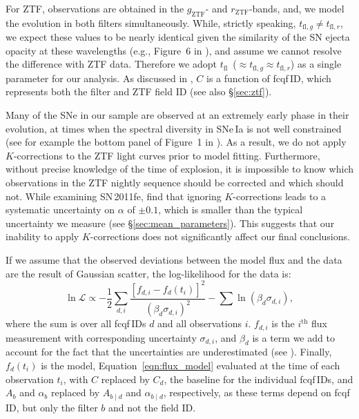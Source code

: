 \documentclass[twocolumn]{./aastex63}
\newcommand{\rztf}{$r_\mathrm{ZTF}$}
\newcommand{\gztf}{$g_\mathrm{ZTF}$}
\newcommand{\tfl}{$t_\mathrm{fl}$}
\begin{document}
For ZTF, observations are obtained in the \gztf- and \rztf-bands, and, we
model the evolution in both filters simultaneously. While, strictly speaking,
$t_{\mathrm{fl}, g} \ne t_{\mathrm{fl}, r}$, we expect these values to be
nearly identical given the similarity of the SN ejecta opacity at these
wavelengths (e.g., Figure~6 in \citealt{Magee18}), and assume we cannot
resolve the difference with ZTF data. Therefore we adopt \tfl\ ($\approx
t_{\mathrm{fl}, g} \approx t_{\mathrm{fl}, r}$) as a single parameter for our
analysis. As discussed in \citet{Yao19}, $C$ is a function of fcqf\,ID, which
represents both the filter and ZTF field ID (see also \S\ref{sec:ztf}).

Many of the SNe in our sample are observed at an extremely early phase in
their evolution, at times when the spectral diversity in SNe\,Ia is not well
constrained (see for example the bottom panel of Figure~1 in \citealt{Guy07}).
As a result, we do not apply $K$-corrections to the ZTF light curves prior to
model fitting. Furthermore, without precise knowledge of the time of
explosion, it is impossible to know which observations in the ZTF nightly
sequence should be corrected and which should not. While examining SN\,2011fe,
\citet{Firth15} find that ignoring $K$-corrections leads to a systematic
uncertainty on $\alpha$ of $\pm0.1$, which is smaller than the typical
uncertainty we measure (see \S\ref{sec:mean_parameters}). This suggests that
our inability to apply $K$-corrections does not significantly affect our final
conclusions.

If we assume that the observed deviations between the model flux and the data
are the result of Gaussian scatter, the log-likelihood for the data is:
%
\begin{equation}
    \ln \mathscr{L} \propto -\frac{1}{2}\sum_{d,i} \frac{[f_{d,i} - f_d(t_i)]^2}{(\beta_d \sigma_{d,i})^2} -\sum{\ln (\beta_d \sigma_{d,i})},
\end{equation}
%
where the sum is over all fcqf\,IDs $d$ and all observations $i$. $f_{d,i}$
is the $i^\mathrm{th}$ flux measurement with corresponding uncertainty
$\sigma_{d,i}$, and $\beta_d$ is a term we add to account for the fact that
the uncertainties are underestimated (see \citealt{Yao19}). Finally,
$f_d(t_i)$ is the model, Equation~\ref{eqn:flux_model} evaluated at the time
of each observation $t_i$, with $C$ replaced by $C_d$, the baseline for the
individual fcqf\,IDs, and $A_b$ and $\alpha_b$ replaced by $A_{b\mid d}$ and
$\alpha_{b\mid d}$, respectively, as these terms depend on fcqf\,ID, but
only the filter $b$ and not the field ID.
\end{document}
